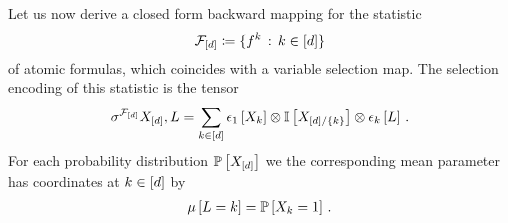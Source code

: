 Let us now derive a closed form backward mapping for the statistic
\begin{align*}
    \mathcal{F}_{[d]} \coloneqq \{f^{k} \,:\, k\in[d]\}
\end{align*}
of atomic formulas, which coincides with a variable selection map.
The selection encoding of this statistic is the tensor
\begin{align*}
    \sigma^{\mathcal{F}_{[d]}}{X_{[d]},L}
    = \sum_{k\in[d]} \epsilon_{1}\left[X_{k}\right]
    \otimes \mathbb{I}\left[X_{[d]/\{k\}}\right] \otimes \epsilon_{k}\left[L\right] \, .
\end{align*}
For each probability distribution $\mathbb{P}\left[X_{[d]}\right]$ we the corresponding mean parameter has coordinates at $k\in[d]$ by
\begin{align*}
    \mu\left[L=k\right] = \mathbb{P}\left[X_{k}=1\right]  \, .
\end{align*}

